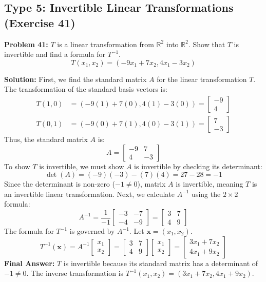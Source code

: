 \documentclass[12pt]{article}
\begin{document}
\subsection{Type 5: Invertible Linear Transformations (Exercise 41)}

\textbf{Problem 41:} $T$ is a linear transformation from $\mathbb{R}^2$ into $\mathbb{R}^2$. Show that $T$ is invertible and find a formula for $T^{-1}$.
\[
T(x_1, x_2) = (-9x_1 + 7x_2, 4x_1 - 3x_2)
\]

\textbf{Solution:}
First, we find the standard matrix $A$ for the linear transformation $T$. The transformation of the standard basis vectors is:
\begin{align*}
    T(1, 0) &= (-9(1) + 7(0), 4(1) - 3(0)) = \begin{bmatrix} -9 \\ 4 \end{bmatrix} \\
    T(0, 1) &= (-9(0) + 7(1), 4(0) - 3(1)) = \begin{bmatrix} 7 \\ -3 \end{bmatrix}
\end{align*}
Thus, the standard matrix $A$ is:
\[
A = \begin{bmatrix} -9 & 7 \\ 4 & -3 \end{bmatrix}
\]
To show $T$ is invertible, we must show $A$ is invertible by checking its determinant:
\[
\det(A) = (-9)(-3) - (7)(4) = 27 - 28 = -1
\]
Since the determinant is non-zero ($-1 \neq 0$), matrix $A$ is invertible, meaning $T$ is an invertible linear transformation.
Next, we calculate $A^{-1}$ using the $2 \times 2$ formula:
\[
A^{-1} = \frac{1}{-1} \begin{bmatrix} -3 & -7 \\ -4 & -9 \end{bmatrix} = \begin{bmatrix} 3 & 7 \\ 4 & 9 \end{bmatrix}
\]
The formula for $T^{-1}$ is governed by $A^{-1}$. Let $\mathbf{x} = (x_1, x_2)$. 
\[
T^{-1}(\mathbf{x}) = A^{-1} \begin{bmatrix} x_1 \\ x_2 \end{bmatrix} = \begin{bmatrix} 3 & 7 \\ 4 & 9 \end{bmatrix} \begin{bmatrix} x_1 \\ x_2 \end{bmatrix} = \begin{bmatrix} 3x_1 + 7x_2 \\ 4x_1 + 9x_2 \end{bmatrix}
\]
\textbf{Final Answer:} $T$ is invertible because its standard matrix has a determinant of $-1 \neq 0$. The inverse transformation is $T^{-1}(x_1, x_2) = (3x_1 + 7x_2, 4x_1 + 9x_2)$.
\end{document}
